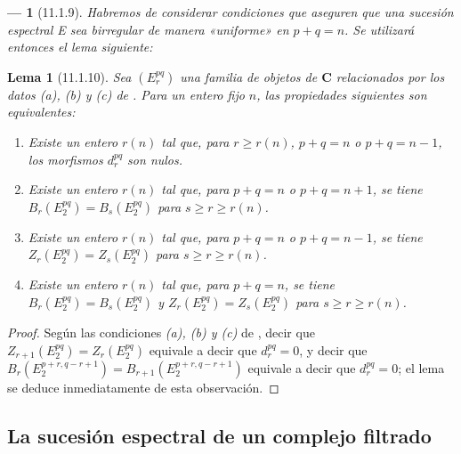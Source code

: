 \documentclass[10pt,oneside,openany]{book}
\theoremstyle{egaenv}\newtheorem*{env}{---}
\theoremstyle{egastatement}
\newtheorem*{lemma}{Lema}
\theoremstyle{egadescription}
\newcommand{\oldpage}[2][]{\marginnote{\normalfont\scriptsize\textbf{#1}\,|\,#2}\ignorespaces}
\renewcommand{\geq}{\geqslant}
\begin{document}
\begin{env}[11.1.9]
\label{0.11.1.9-fr}
Habremos de considerar condiciones que aseguren que una sucesión espectral E sea birregular de manera «uniforme» en $p+q=n$.
Se utilizará entonces el lema siguiente:
\end{env}

\begin{lemma}[11.1.10]
\label{0.11.1.10}
\label{0.11.1.10-fr}
Sea $(E_r^{pq})$ una familia de objetos de $\mathbf{C}$ relacionados por los datos \emph{(a)}, \emph{(b)} y \emph{(c)} de .
Para un entero fijo $n$, las propiedades siguientes son equivalentes:
\begin{enumerate}
  \item[{\rm(a)}] Existe un entero $r(n)$ tal que, para $r\geq r(n)$, $p+q=n$ o $p+q=n-1$, los morfismos $d_r^{pq}$ son nulos.
  \item[{\rm(b)}] Existe un entero $r(n)$ tal que, para $p+q=n$ o $p+q=n+1$, se tiene $B_r(E_2^{pq})=B_s(E_2^{pq})$ para $s\geq r\geq r(n)$.
  \item[{\rm(c)}] Existe un entero $r(n)$ tal que, para $p+q=n$ o $p+q=n-1$, se tiene $Z_r(E_2^{pq})=Z_s(E_2^{pq})$ para $s\geq r\geq r(n)$.
  \item[{\rm(d)}] Existe un entero $r(n)$ tal que, para $p+q=n$, se tiene $B_r(E_2^{pq})=B_s(E_2^{pq})$ y $Z_r(E_2^{pq})=Z_s(E_2^{pq})$ para $s\geq r\geq r(n)$.
\end{enumerate}
\end{lemma}

\begin{proof}
\oldpage[0\textsubscript{III}]{27}
Según las condiciones \emph{(a), (b) y (c)} de , decir que $Z_{r+1}(E_2^{pq})=Z_r(E_2^{pq})$ equivale a decir que $d_r^{pq}=0$, y decir que $B_r(E_2^{p+r,q-r+1})=B_{r+1}(E_2^{p+r,q-r+1})$ equivale a decir que $d_r^{pq}=0$; el lema se deduce inmediatamente de esta observación.
\end{proof}

\subsection{La sucesión espectral de un complejo filtrado}
\label{subsection:0.11.2}
\label{subsection:0.11.2-fr}
\end{document}
